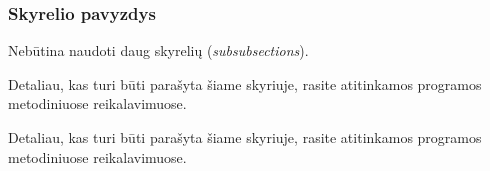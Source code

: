 \documentclass[]{VUMIFTemplateClass}
\begin{document}
\subsubsection{Skyrelio pavyzdys}
\noindent Nebūtina naudoti daug skyrelių (\textit{subsubsections}).

Detaliau, kas turi būti parašyta šiame skyriuje, rasite atitinkamos programos metodiniuose reikalavimuose. 

Detaliau, kas turi būti parašyta šiame skyriuje, rasite atitinkamos programos metodiniuose reikalavimuose. 

\printbibliography[title = {Šaltiniai}]






\end{document}
